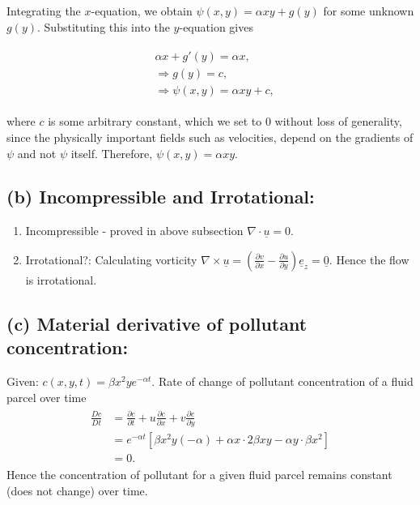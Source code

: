 \documentclass{article}
\begin{document}
Integrating the $x$-equation, we obtain
$\psi(x, y) = \alpha xy + g(y)$ for some unknown $g(y)$. Substituting this into the $y$-equation gives

\begin{align}
 \begin{split}
 & \alpha x + g'(y) = \alpha x, \\
 & \Rightarrow g(y) = c,\\
 & \Rightarrow \psi(x, y) = \alpha xy + c,
 \end{split}
\end{align}

where $c$ is some arbitrary constant, which we set to $0$ without loss of generality, since the physically important fields such as velocities, depend on the gradients of $\psi$ and not $\psi$ itself. Therefore,
$\boxed{\psi(x, y) =  \alpha xy}$.
\subsection*{(b) Incompressible and Irrotational:}
\begin{enumerate}
 \item Incompressible - proved in above subsection $\nabla \cdot \underline{u} = 0$. 
 \item Irrotational?: Calculating vorticity $\nabla \times \underline{u} = \left(\frac{\partial v}{\partial x} - \frac{\partial u}{\partial y} \right)\underline{e}_{z} = \underline{0}$. Hence the flow is irrotational.
\end{enumerate}
\subsection*{(c) Material derivative of pollutant concentration:}
Given: $c(x, y, t) = \beta x^{2}y e^{-\alpha t}$. Rate of change of pollutant concentration of a fluid parcel over time 
\begin{align}\label{eq:pollutant_concentration}
 \begin{split}
  \frac{Dc}{Dt} & = \frac{\partial c}{\partial t} + u \frac{\partial c}{\partial x} + v \frac{\partial c}{\partial y} \\
  &= e^{-\alpha t}\left[\beta x^{2}y(-\alpha) + \alpha x \cdot 2 \beta x y - \alpha y \cdot \beta x^{2}\right]\\
  & = 0.
  \end{split}
\end{align}
Hence the concentration of pollutant for a given fluid parcel remains constant (does not change) over time. 
\end{document}

